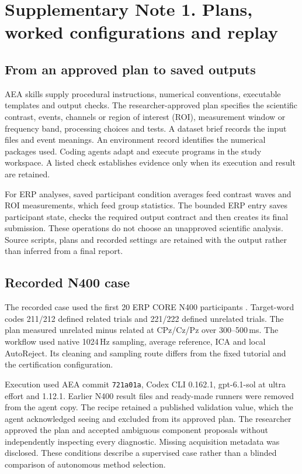 \section*{Supplementary Note 1. Plans, worked configurations and replay}
\label{si:workflows}

\subsection*{From an approved plan to saved outputs}
AEA skills supply procedural instructions, numerical conventions, executable templates and output checks. The researcher-approved plan specifies the scientific contrast, events, channels or region of interest (ROI), measurement window or frequency band, processing choices and tests. A dataset brief records the input files and event meanings. An environment record identifies the numerical packages used. Coding agents adapt and execute programs in the study workspace. A listed check establishes evidence only when its execution and result are retained.

For ERP analyses, saved participant condition averages feed contrast waves and ROI measurements, which feed group statistics. The bounded ERP entry saves participant state, checks the required output contract and then creates its final submission. These operations do not choose an unapproved scientific analysis. Source scripts, plans and recorded settings are retained with the output rather than inferred from a final report.

\subsection*{Recorded N400 case}
The recorded case used the first 20 ERP CORE N400 participants \citep{Kappenman2021}. Target-word codes 211/212 defined related trials and 221/222 defined unrelated trials. The plan measured unrelated minus related at CPz/Cz/Pz over 300--500\,ms. The workflow used native 1024\,Hz sampling, average reference, ICA and local AutoReject. Its cleaning and sampling route differs from the fixed tutorial and the certification configuration.

Execution used AEA commit \texttt{721a01a}, Codex CLI 0.162.1, gpt-6.1-sol at ultra effort and \mne{} 1.12.1. Earlier N400 result files and ready-made runners were removed from the agent copy. The recipe retained a published validation value, which the agent acknowledged seeing and excluded from its approved plan. The researcher approved the plan and accepted ambiguous component proposals without independently inspecting every diagnostic. Missing acquisition metadata was disclosed. These conditions describe a supervised case rather than a blinded comparison of autonomous method selection.


